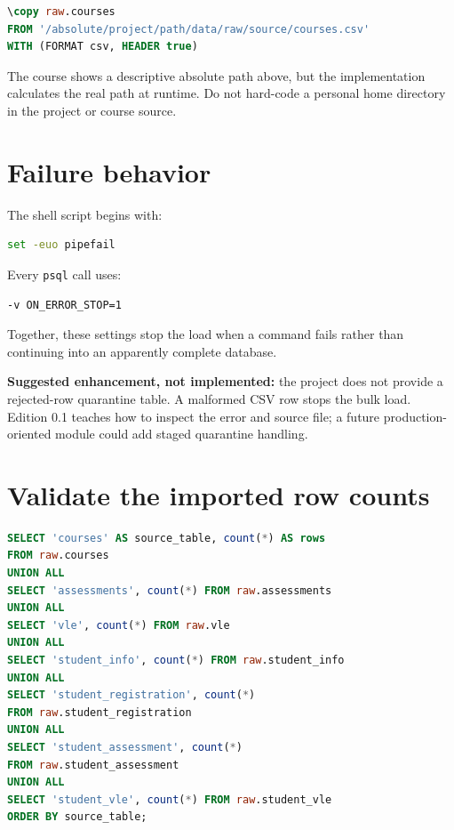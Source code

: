 \begin{lstlisting}[language=SQL,caption={The project bulk-load pattern.}]
\copy raw.courses
FROM '/absolute/project/path/data/raw/source/courses.csv'
WITH (FORMAT csv, HEADER true)
\end{lstlisting}

The course shows a descriptive absolute path above, but the implementation
calculates the real path at runtime. Do not hard-code a personal home directory
in the project or course source.

\section{Failure behavior}

The shell script begins with:

\begin{lstlisting}[language=bash]
set -euo pipefail
\end{lstlisting}

Every \texttt{psql} call uses:

\begin{lstlisting}[language=bash]
-v ON_ERROR_STOP=1
\end{lstlisting}

Together, these settings stop the load when a command fails rather than
continuing into an apparently complete database.

\begin{editionnote}
\textbf{Suggested enhancement, not implemented:} the project does not provide a
rejected-row quarantine table. A malformed CSV row stops the bulk load.
Edition 0.1 teaches how to inspect the error and source file; a future
production-oriented module could add staged quarantine handling.
\end{editionnote}

\section{Validate the imported row counts}

\begin{lstlisting}[language=SQL,caption={Instructional row-count reconciliation
query based on the implemented gallery.}]
SELECT 'courses' AS source_table, count(*) AS rows
FROM raw.courses
UNION ALL
SELECT 'assessments', count(*) FROM raw.assessments
UNION ALL
SELECT 'vle', count(*) FROM raw.vle
UNION ALL
SELECT 'student_info', count(*) FROM raw.student_info
UNION ALL
SELECT 'student_registration', count(*)
FROM raw.student_registration
UNION ALL
SELECT 'student_assessment', count(*)
FROM raw.student_assessment
UNION ALL
SELECT 'student_vle', count(*) FROM raw.student_vle
ORDER BY source_table;
\end{lstlisting}

